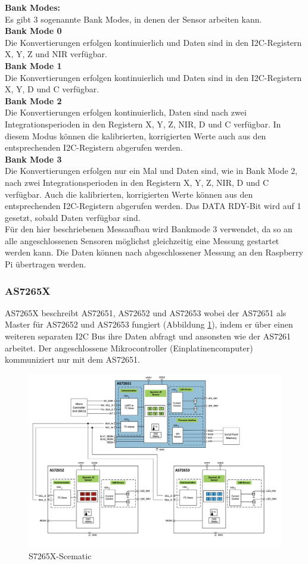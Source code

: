 \noindent \textbf{Bank Modes:}\\
\label{sec_bank_modes}
Es gibt 3 sogenannte Bank Modes, in denen der Sensor arbeiten kann.\\
\textbf{Bank Mode 0}\\
Die Konvertierungen erfolgen kontinuierlich und Daten sind in den I2C-Registern X, Y, Z und NIR verfügbar.\\
\textbf{Bank Mode 1}\\
Die Konvertierungen erfolgen kontinuierlich und Daten sind in den I2C-Registern X, Y, D und C verfügbar.\\
\textbf{Bank Mode 2}\\
Die Konvertierungen erfolgen kontinuierlich, Daten sind nach zwei Integrationsperioden in den Registern X, Y, Z, NIR, D und C verfügbar. 
In diesem Modus können die kalibrierten, korrigierten Werte auch aus den entsprechenden I2C-Registern abgerufen werden.\\
\textbf{Bank Mode 3}\\
Die Konvertierungen erfolgen nur ein Mal und Daten sind, wie in Bank Mode 2, nach zwei Integrationsperioden in den Registern X, Y, Z, NIR, D und C verfügbar.
Auch die kalibrierten, korrigierten Werte können aus den entsprechenden I2C-Registern abgerufen werden.
Das DATA RDY-Bit wird auf 1 gesetzt, sobald Daten verfügbar sind.\\
Für den hier beschriebenen Messaufbau wird Bankmode 3 verwendet, da so an alle angeschlossenen Sensoren möglichst gleichzeitig eine Messung gestartet werden kann.
Die Daten können nach abgeschlossener Messung an den Raspberry Pi übertragen werden.

\subsubsection{AS7265X}\label{AS7265X}
AS7265X beschreibt AS72651, AS72652 und AS72653 wobei der AS72651 als Master für AS72652 und AS72653 fungiert (Abbildung \ref{fig:S7265X-Scematic}), indem er über einen weiteren separaten I2C Bus ihre Daten abfragt und ansonsten wie der AS7261 arbeitet.
Der angeschlossene Mikrocontroller (Einplatinencomputer) kommuniziert nur mit dem AS72651.

\begin{figure}[H]
  \centering
 \includegraphics[width=0.9\linewidth]{img/AS7265X-Scematic.png}
 \caption{S7265X-Scematic\cite{Datenblatt_AS7265X}}
  \label{fig:S7265X-Scematic}
\end{figure}


